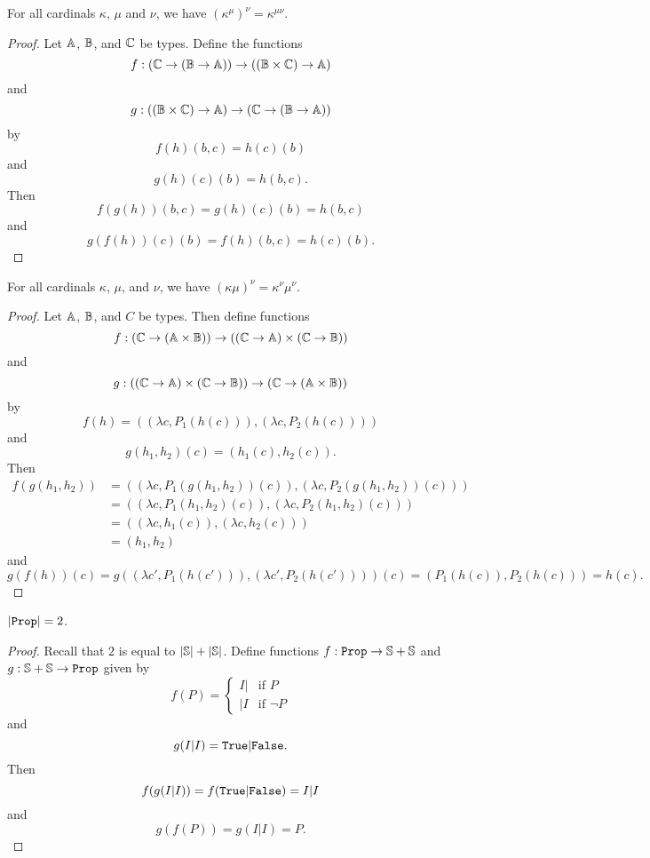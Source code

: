 \documentclass[../../math.tex]{subfiles}
\begin{document}
\begin{theorem}
    For all cardinals $\kappa$, $\mu$ and $\nu$, we have $(\kappa ^ \mu) ^ \nu =
    \kappa ^ {\mu \nu}$.
\end{theorem}
\begin{proof}
    Let $\A$, $\B$, and $\C$ be types.  Define the functions
    \[
        f : (\C \to (\B \to \A)) \to ((\B \times \C) \to \A)
    \]
    and
    \[
        g : ((\B \times \C) \to \A) \to (\C \to (\B \to \A))
    \]
    by
    \[
        f(h)(b, c) = h(c)(b)
    \]
    and
    \[
        g(h)(c)(b) = h(b, c).
    \]
    Then
    \[
        f(g(h))(b, c) = g(h)(c)(b) = h(b, c)
    \]
    and
    \[
        g(f(h))(c)(b) = f(h)(b, c) = h(c)(b).
    \]
\end{proof}

\begin{theorem}
    For all cardinals $\kappa$, $\mu$, and $\nu$, we have $(\kappa \mu)^\nu =
    \kappa ^ \nu \mu ^ \nu$.
\end{theorem}
\begin{proof}
    Let $\A$, $\B$, and $C$ be types.  Then define functions
    \[
        f : (\C \to (\A \times \B)) \to ((\C \to \A) \times (\C \to \B))
    \]
    and
    \[
        g : ((\C \to \A) \times (\C \to \B)) \to (\C \to (\A \times \B))
    \]
    by
    \[
        f(h) = ((\lambda c, P_1(h(c))), (\lambda c, P_2(h(c))))
    \]
    and
    \[
        g(h_1, h_2)(c) = (h_1(c), h_2(c)).
    \]
    Then
    \begin{align*}
        f(g(h_1, h_2))
        &= ((\lambda c, P_1(g(h_1, h_2))(c)), (\lambda c, P_2(g(h_1, h_2))(c)))
            \\
        &= ((\lambda c, P_1(h_1, h_2)(c)), (\lambda c, P_2(h_1, h_2)(c))) \\
        &= ((\lambda c, h_1(c)), (\lambda c, h_2(c))) \\
        &= (h_1, h_2)
    \end{align*}
    and
    \[
        g(f(h))(c)
        = g((\lambda c', P_1(h(c'))), (\lambda c', P_2(h(c'))))(c)
        = (P_1(h(c)), P_2(h(c)))
        = h(c).
    \]
\end{proof}

\begin{theorem}
    $|\Prop| = 2$.
\end{theorem}
\begin{proof}
    Recall that $2$ is equal to $|\S| + |\S|$.  Define functions $f : \Prop \to
    \S + \S$ and $g : \S + \S \to \Prop$ given by
    \[
        f(P) = \begin{cases}
            I| & \text{if $P$} \\
            |I & \text{if $\neg P$}
        \end{cases}
    \]
    and
    \[
        g(I|I) = \True|\False.
    \]
    Then
    \[
        f(g(I|I)) = f(\True|\False) = I|I
    \]
    and
    \[
        g(f(P)) = g(I|I) = P.
    \]
\end{proof}
\end{document}
